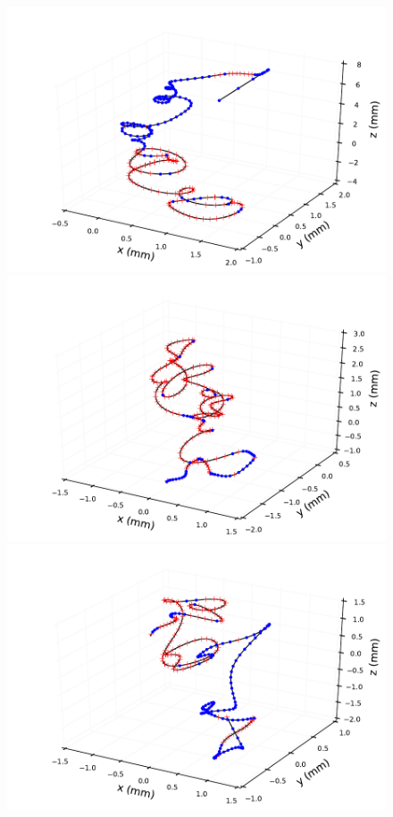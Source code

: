 \documentclass{JINST}
\begin{document}
\begin{figure}[!htb]
	\includegraphics[scale=0.48]{fig/plt_trkcurv_magbb05_ms13pt6_0.pdf}
	\includegraphics[scale=0.48]{fig/plt_trkcurv_magse05_ms27pt2_0.pdf}
	\includegraphics[scale=0.48]{fig/plt_trkcurv_magbb05_ms27pt2_1.pdf}

\end{figure}
\end{document}
